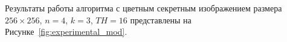 \documentclass[a4paper,article,14pt]{extarticle}
\begin{document}
Результаты работы алгоритма с цветным секретным изображением размера $256\times256$, $n=4$, $k=3$, $TH=16$ представлены на Рисунке~\ref{fig:experimental_mod}.

\begin{figure}[ph!]
    \begin{minipage}[h]{0.3\linewidth}
    \end{minipage}
    \hfill
    \begin{minipage}[h]{0.3\linewidth}

\end{minipage}
\end{figure}
\end{document}
